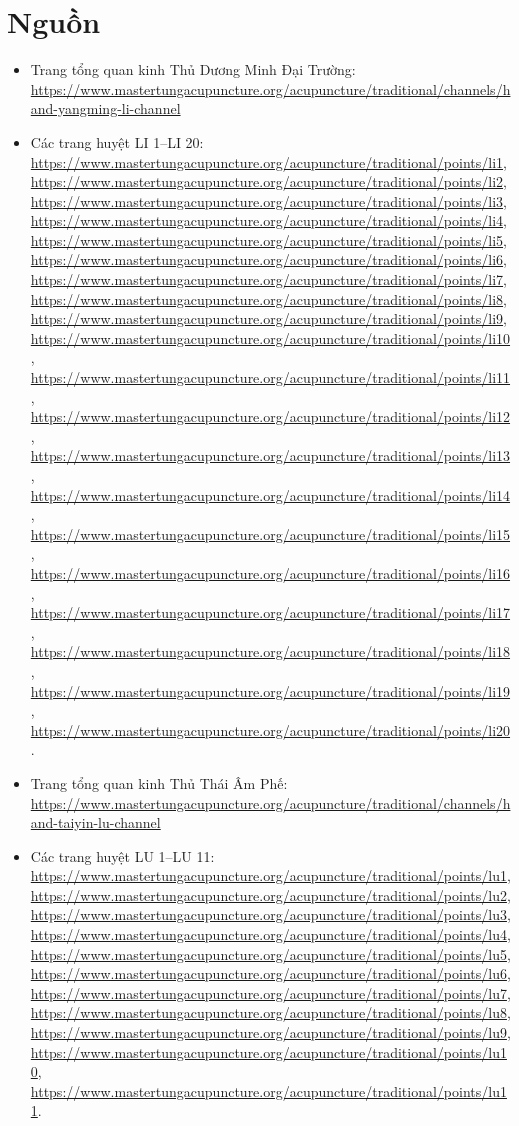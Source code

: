 \documentclass[12pt,a4paper]{article}
\begin{document}
\section*{Nguồn}
\begin{itemize}
  \item Trang tổng quan kinh Thủ Dương Minh Đại Trường: \url{https://www.mastertungacupuncture.org/acupuncture/traditional/channels/hand-yangming-li-channel}
  \item Các trang huyệt LI 1--LI 20: \url{https://www.mastertungacupuncture.org/acupuncture/traditional/points/li1}, \url{https://www.mastertungacupuncture.org/acupuncture/traditional/points/li2}, \url{https://www.mastertungacupuncture.org/acupuncture/traditional/points/li3}, \url{https://www.mastertungacupuncture.org/acupuncture/traditional/points/li4}, \url{https://www.mastertungacupuncture.org/acupuncture/traditional/points/li5}, \url{https://www.mastertungacupuncture.org/acupuncture/traditional/points/li6}, \url{https://www.mastertungacupuncture.org/acupuncture/traditional/points/li7}, \url{https://www.mastertungacupuncture.org/acupuncture/traditional/points/li8}, \url{https://www.mastertungacupuncture.org/acupuncture/traditional/points/li9}, \url{https://www.mastertungacupuncture.org/acupuncture/traditional/points/li10}, \url{https://www.mastertungacupuncture.org/acupuncture/traditional/points/li11}, \url{https://www.mastertungacupuncture.org/acupuncture/traditional/points/li12}, \url{https://www.mastertungacupuncture.org/acupuncture/traditional/points/li13}, \url{https://www.mastertungacupuncture.org/acupuncture/traditional/points/li14}, \url{https://www.mastertungacupuncture.org/acupuncture/traditional/points/li15}, \url{https://www.mastertungacupuncture.org/acupuncture/traditional/points/li16}, \url{https://www.mastertungacupuncture.org/acupuncture/traditional/points/li17}, \url{https://www.mastertungacupuncture.org/acupuncture/traditional/points/li18}, \url{https://www.mastertungacupuncture.org/acupuncture/traditional/points/li19}, \url{https://www.mastertungacupuncture.org/acupuncture/traditional/points/li20}.
  \item Trang tổng quan kinh Thủ Thái Âm Phế: \url{https://www.mastertungacupuncture.org/acupuncture/traditional/channels/hand-taiyin-lu-channel}
  \item Các trang huyệt LU 1--LU 11: \url{https://www.mastertungacupuncture.org/acupuncture/traditional/points/lu1}, \url{https://www.mastertungacupuncture.org/acupuncture/traditional/points/lu2}, \url{https://www.mastertungacupuncture.org/acupuncture/traditional/points/lu3}, \url{https://www.mastertungacupuncture.org/acupuncture/traditional/points/lu4}, \url{https://www.mastertungacupuncture.org/acupuncture/traditional/points/lu5}, \url{https://www.mastertungacupuncture.org/acupuncture/traditional/points/lu6}, \url{https://www.mastertungacupuncture.org/acupuncture/traditional/points/lu7}, \url{https://www.mastertungacupuncture.org/acupuncture/traditional/points/lu8}, \url{https://www.mastertungacupuncture.org/acupuncture/traditional/points/lu9}, \url{https://www.mastertungacupuncture.org/acupuncture/traditional/points/lu10}, \url{https://www.mastertungacupuncture.org/acupuncture/traditional/points/lu11}.

\end{itemize}
\end{document}
